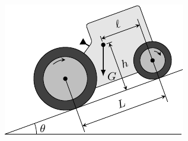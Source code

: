 \begin{enumerate}
\begin{figure}[htbp]
	\centering
	\includegraphics{fig/A/6-28.pdf}
	\caption{}\label{fig_A_6-28}
\end{figure}


\end{enumerate}







	
	
	
	
	
	
	
	
	
	
	
	
	
	
	
	
	
	
	
	
	
	
